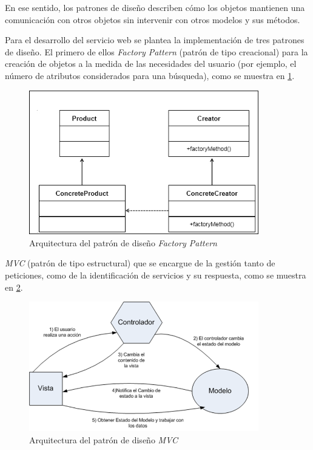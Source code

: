  En ese sentido, los patrones de diseño describen cómo los objetos mantienen una comunicación con otros objetos sin intervenir con otros modelos y sus métodos.
 
 Para el desarrollo del servicio web se plantea la implementación de tres patrones de diseño. El primero de ellos \textit{Factory Pattern} (patrón de tipo creacional) para la creación de objetos a la medida de las necesidades del usuario (por ejemplo, el número de atributos considerados para una búsqueda), como se muestra en \ref{factory_pattern}. \newline
 
 \begin{figure}[!ht]
    \centering
    \includegraphics[width=10cm]{figures/factory_pattern.jpg} %
    \caption{Arquitectura del patrón de diseño \textit{Factory Pattern}} %
    \label{factory_pattern}
\end{figure}
 
 \textit{MVC} (patrón de tipo estructural) que se encargue de la gestión tanto de peticiones, como de la identificación de servicios y su respuesta, como se muestra en \ref{mvc_pattern}. \newline 
 
 \begin{figure}[!ht]
    \centering
    \includegraphics[width=10cm]{figures/mvc_pattern.png} %
    \caption{Arquitectura del patrón de diseño \textit{MVC}} %
    \label{mvc_pattern}
\end{figure}
 
